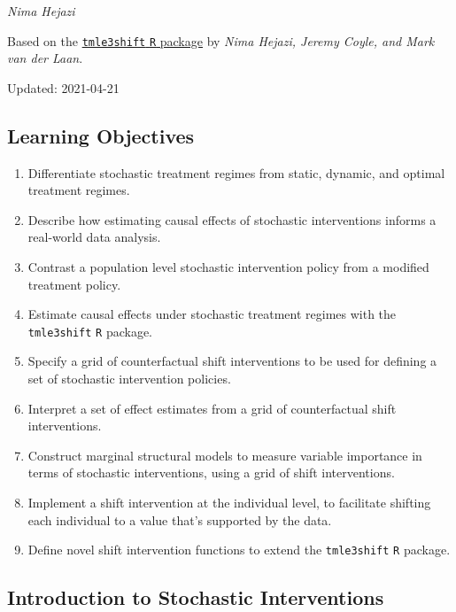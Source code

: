 \documentclass[12pt, krantz2,]{krantz}
\providecommand{\tightlist}{%
  \setlength{\itemsep}{0pt}\setlength{\parskip}{0pt}}
\theoremstyle{definition}
\theoremstyle{definition}
\theoremstyle{definition}
\newcommand{\1}{\mathbbm{1}}
\begin{document}
\emph{Nima Hejazi}

Based on the \href{https://github.com/tlverse/tmle3shift}{\texttt{tmle3shift} \texttt{R} package}
by \emph{Nima Hejazi, Jeremy Coyle, and Mark van der Laan}.

Updated: 2021-04-21

\hypertarget{learning-objectives-5}{%
\subsection{Learning Objectives}\label{learning-objectives-5}}

\begin{enumerate}
\def\labelenumi{\arabic{enumi}.}
\tightlist
\item
  Differentiate stochastic treatment regimes from static, dynamic, and optimal
  treatment regimes.
\item
  Describe how estimating causal effects of stochastic interventions informs a
  real-world data analysis.
\item
  Contrast a population level stochastic intervention policy from a modified
  treatment policy.
\item
  Estimate causal effects under stochastic treatment regimes with the
  \texttt{tmle3shift} \texttt{R} package.
\item
  Specify a grid of counterfactual shift interventions to be used for defining
  a set of stochastic intervention policies.
\item
  Interpret a set of effect estimates from a grid of counterfactual shift
  interventions.
\item
  Construct marginal structural models to measure variable importance in terms
  of stochastic interventions, using a grid of shift interventions.
\item
  Implement a shift intervention at the individual level, to facilitate
  shifting each individual to a value that's supported by the data.
\item
  Define novel shift intervention functions to extend the \texttt{tmle3shift} \texttt{R}
  package.
\end{enumerate}

\hypertarget{introduction-to-stochastic-interventions}{%
\subsection{Introduction to Stochastic Interventions}\label{introduction-to-stochastic-interventions}}
\end{document}
